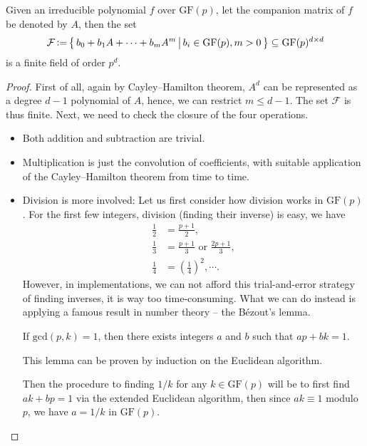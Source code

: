 \begin{theorem}\label{thm:w9_gen_fin_field}
    Given an irreducible polynomial $f$ over $\mathrm{GF}(p)$, let the companion matrix of $f$ be denoted by $A$, then the set
    \begin{equation}
        \mathcal{F} \operatorname{\vcentcolon=} \left\{\,{b_0 + b_1 A + \cdots + b_mA^m}\,\middle\vert\,{b_i\in\mathrm{GF}(p), m>0}\,\right\} \subseteq \mathrm{GF}(p)^{d\times d}
    \end{equation}
    is a finite field of order $p^d$.
\end{theorem}
\begin{proof}
    First of all, again by Cayley--Hamilton theorem, $A^d$ can be represented as a degree $d-1$ polynomial of $A$, hence, we can restrict $m\le d-1$. The set $\mathcal{F}$ is thus finite. Next, we need to check the closure of the four operations.
    \begin{itemize}
        \item Both addition and subtraction are trivial.
        \item Multiplication is just the convolution of coefficients, with suitable application of the Cayley--Hamilton theorem from time to time.
        \item Division is more involved: Let us first consider how division works in $\mathrm{GF}(p)$. For the first few integers, division (finding their inverse) is easy, we have
        \begin{align*}
            \frac{1}{2} &= \frac{p+1}{2}, \\
            \frac{1}{3} &= \frac{p+1}{3} \text{ or } \frac{2p+1}{3}, \\
            \frac{1}{4} &= \left(\frac{1}{4}\right)^2, \cdots.
        \end{align*}
        However, in implementations, we can not afford this trial-and-error strategy of finding inverses, it is way too time-consuming. What we can do instead is applying a famous result in number theory -- the B\'ezout's lemma.
        \begin{lemma}
            If $\mathrm{gcd}(p,k)=1$, then there exists integers $a$ and $b$ such that $ap+bk=1$.
        \end{lemma}
        This lemma can be proven by induction on the Euclidean algorithm.

        Then the procedure to finding $1/k$ for any $k\in\mathrm{GF}(p)$ will be to first find $ak+bp=1$ via the extended Euclidean algorithm, then since $ak\equiv1$ modulo $p$, we have $a=1/k$ in $\mathrm{GF}(p)$.


\end{itemize}
\end{proof}
